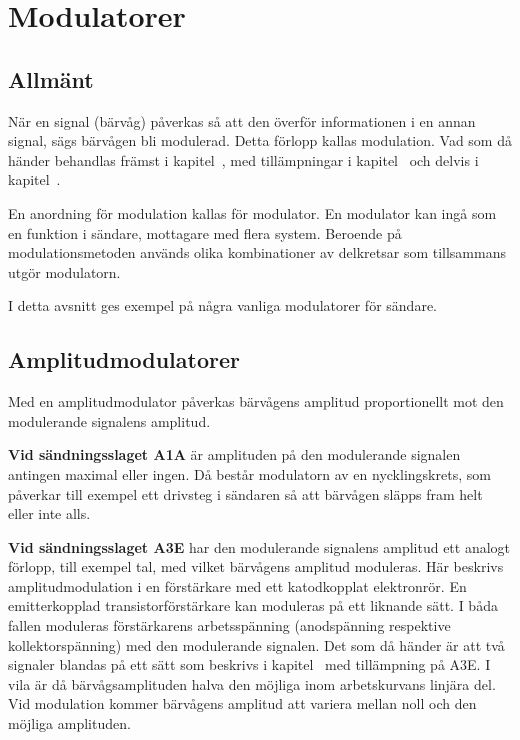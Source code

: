 
\section{Modulatorer}

\subsection{Allmänt}

När en signal (bärvåg) påverkas så att den överför informationen i en annan
signal, sägs bärvågen bli modulerad.
Detta förlopp kallas modulation.
Vad som då händer behandlas främst i kapitel~, med
tillämpningar i kapitel~ och delvis i
kapitel~.

En anordning för modulation kallas för modulator.
En modulator kan ingå som en funktion i sändare, mottagare med flera system.
Beroende på modulationsmetoden används olika kombinationer av delkretsar som
tillsammans utgör modulatorn.

I detta avsnitt ges exempel på några vanliga modulatorer för sändare.

\subsection{Amplitudmodulatorer}

Med en amplitudmodulator påverkas bärvågens amplitud proportionellt
mot den modulerande signalens amplitud.

\textbf{Vid sändningsslaget A1A} är amplituden på den modulerande signalen
antingen maximal eller ingen.
Då består modulatorn av en nycklingskrets, som påverkar till exempel ett
drivsteg i sändaren så att bärvågen släpps fram helt eller inte alls.

\textbf{Vid sändningsslaget A3E} har den modulerande signalens amplitud
ett analogt förlopp, till exempel tal, med vilket bärvågens amplitud moduleras.
Här beskrivs amplitudmodulation i en förstärkare med ett katodkopplat
elektronrör.
En emitterkopplad transistorförstärkare kan moduleras på ett liknande sätt.
I båda fallen moduleras förstärkarens arbetsspänning (anodspänning respektive 
kollektorspänning) med den modulerande signalen.
Det som då händer är att två signaler blandas på ett sätt som beskrivs i
kapitel~ med tillämpning på A3E.
I vila är då bärvågsamplituden halva den möjliga inom arbetskurvans linjära del.
Vid modulation kommer bärvågens amplitud att variera mellan noll
och den möjliga amplituden.


